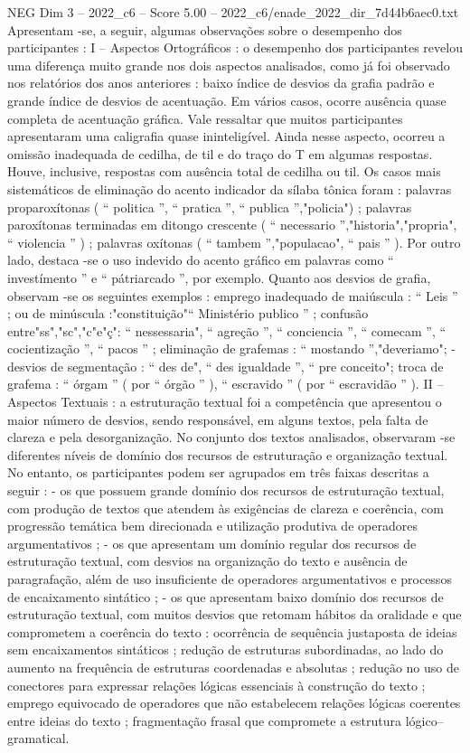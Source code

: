 \begin{textsample}{NEG Dim 3 – 2022\_c6 – Score 5.00 – 2022\_c6/enade\_2022\_dir\_7d44b6aec0.txt}
Apresentam -se, a seguir, algumas observações sobre o desempenho dos participantes : I – Aspectos Ortográficos : o desempenho dos participantes revelou uma diferença muito grande nos dois aspectos analisados, como já foi observado nos relatórios dos anos anteriores : baixo índice de desvios da grafia padrão e grande índice de desvios de acentuação.
Em vários casos, ocorre ausência quase completa de acentuação gráfica.
Vale ressaltar que muitos participantes apresentaram uma caligrafia quase ininteligível.
Ainda nesse aspecto, ocorreu a omissão inadequada de cedilha, de til e do traço do T em algumas respostas.
Houve, inclusive, respostas com ausência total de cedilha ou til.
Os casos mais sistemáticos de eliminação do acento indicador da sílaba tônica foram : palavras proparoxítonas ( “ politica ”, “ pratica ”, “ publica ”,"policia") ; palavras paroxítonas terminadas em ditongo crescente ( “ necessario ”,"historia","propria", “ violencia ” ) ; palavras oxítonas ( “ tambem ”,"populacao", “ pais ” ).
Por outro lado, destaca -se o uso indevido do acento gráfico em palavras como “ investímento ” e “ pátriarcado ”, por exemplo.
Quanto aos desvios de grafia, observam -se os seguintes exemplos : emprego inadequado de maiúscula : “ Leis ” ; ou de minúscula :"constituição"“ Ministério publico ” ; confusão entre"ss","sc","c"e"ç": “ nessessaria", “ agreção ”, “ conciencia ”, “ comecam ”, “ cocientização ”, “ pacos ” ; eliminação de grafemas : “ mostando ”,"deveriamo"; - desvios de segmentação : “ des de", “ des igualdade ”, “ pre conceito"; troca de grafema : “ órgam ” ( por “ órgão ” ), “ escravido ” ( por “ escravidão ” ).
II – Aspectos Textuais : a estruturação textual foi a competência que apresentou o maior número de desvios, sendo responsável, em alguns textos, pela falta de clareza e pela desorganização.
No conjunto dos textos analisados, observaram -se diferentes níveis de domínio dos recursos de estruturação e organização textual.
No entanto, os participantes podem ser agrupados em três faixas descritas a seguir : - os que possuem grande domínio dos recursos de estruturação textual, com produção de textos que atendem às exigências de clareza e coerência, com progressão temática bem direcionada e utilização produtiva de operadores argumentativos ; - os que apresentam um domínio regular dos recursos de estruturação textual, com desvios na organização do texto e ausência de paragrafação, além de uso insuficiente de operadores argumentativos e processos de encaixamento sintático ; - os que apresentam baixo domínio dos recursos de estruturação textual, com muitos desvios que retomam hábitos da oralidade e que comprometem a coerência do texto : ocorrência de sequência justaposta de ideias sem encaixamentos sintáticos ; redução de estruturas subordinadas, ao lado do aumento na frequência de estruturas coordenadas e absolutas ; redução no uso de conectores para expressar relações lógicas essenciais à construção do texto ; emprego equivocado de operadores que não estabelecem relações lógicas coerentes entre ideias do texto ; fragmentação frasal que compromete a estrutura lógico–gramatical.

\end{textsample}
